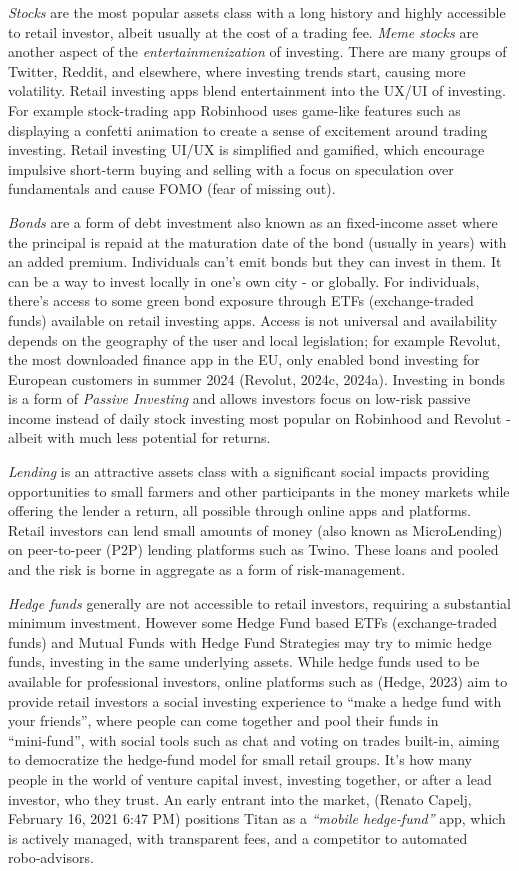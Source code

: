 \documentclass[
  12pt,
  letterpaper,
  DIV=11,
  numbers=noendperiod]{scrartcl}
\begin{document}
\emph{Stocks} are the most popular assets class with a long history and
highly accessible to retail investor, albeit usually at the cost of a
trading fee. \emph{Meme stocks} are another aspect of the
\emph{entertainmenization} of investing. There are many groups of
Twitter, Reddit, and elsewhere, where investing trends start, causing
more volatility. Retail investing apps blend entertainment into the
UX/UI of investing. For example stock-trading app Robinhood uses
game-like features such as displaying a confetti animation to create a
sense of excitement around trading investing. Retail investing UI/UX is
simplified and gamified, which encourage impulsive short-term buying and
selling with a focus on speculation over fundamentals and cause FOMO
(fear of missing out).

\emph{Bonds} are a form of debt investment also known as an fixed-income
asset where the principal is repaid at the maturation date of the bond
(usually in years) with an added premium. Individuals can't emit bonds
but they can invest in them. It can be a way to invest locally in one's
own city - or globally. For individuals, there's access to some green
bond exposure through ETFs (exchange-traded funds) available on retail
investing apps. Access is not universal and availability depends on the
geography of the user and local legislation; for example Revolut, the
most downloaded finance app in the EU, only enabled bond investing for
European customers in summer 2024 (Revolut, 2024c, 2024a). Investing in
bonds is a form of \emph{Passive Investing} and allows investors focus
on low-risk passive income instead of daily stock investing most popular
on Robinhood and Revolut - albeit with much less potential for returns.

\emph{Lending} is an attractive assets class with a significant social
impacts providing opportunities to small farmers and other participants
in the money markets while offering the lender a return, all possible
through online apps and platforms. Retail investors can lend small
amounts of money (also known as MicroLending) on peer-to-peer (P2P)
lending platforms such as Twino. These loans and pooled and the risk is
borne in aggregate as a form of risk-management.

\emph{Hedge funds} generally are not accessible to retail investors,
requiring a substantial minimum investment. However some Hedge Fund
based ETFs (exchange-traded funds) and Mutual Funds with Hedge Fund
Strategies may try to mimic hedge funds, investing in the same
underlying assets. While hedge funds used to be available for
professional investors, online platforms such as (Hedge, 2023) aim to
provide retail investors a social investing experience to ``make a hedge
fund with your friends'', where people can come together and pool their
funds in ``mini‑fund'', with social tools such as chat and voting on
trades built-in, aiming to democratize the hedge‑fund model for small
retail groups. It's how many people in the world of venture capital
invest, investing together, or after a lead investor, who they trust. An
early entrant into the market, (Renato Capelj, February 16, 2021 6:47
PM) positions Titan as a \emph{``mobile hedge‑fund''} app, which is
actively managed, with transparent fees, and a competitor to automated
robo‑advisors.
\end{document}
